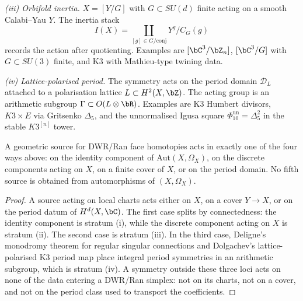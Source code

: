 \emph{(iii) Orbifold inertia.} $X=[Y/G]$ with
$G\subset SU(d)$ finite acting on a smooth Calabi--Yau $Y$. The
inertia stack
\[
 I(X)=\coprod_{[g]\in G/\mathrm{conj}}Y^g/C_G(g)
\]
records the action after quotienting. Examples are
$[\bC^3/\bZ_n]$, $[\bC^3/G]$ with $G\subset SU(3)$ finite, and K3
with Mathieu-type twining data.

\emph{(iv) Lattice-polarised period.} The symmetry acts on the period
domain $\mathcal D_L$ attached to a polarisation lattice
$L\subset H^2(X,\bZ)$. The acting group is an arithmetic subgroup
$\Gamma\subset O(L\otimes\bR)$. Examples are K3 Humbert divisors,
$K3\times E$ via Gritsenko $\Delta_5$, and the unnormalised Igusa
square $\Phi_{10}^{\mathrm{un}}=\Delta_5^2$ in the stable $K3^{[n]}$
tower.

\begin{proposition}
\label{prop:four-strata-exhaust}
A geometric source for DWR/Ran face homotopies acts in exactly one of
the four ways above: on the identity component of
$\mathrm{Aut}(X,\Omega_X)$, on the discrete components acting on $X$,
on a finite cover of $X$, or on the period domain. No fifth source is
obtained from automorphisms of $(X,\Omega_X)$.
\end{proposition}

\begin{proof}
A source acting on local charts acts either on $X$, on a cover
$Y\to X$, or on the period datum of $H^d(X,\bC)$. The first case splits
by connectedness: the identity component is stratum (i), while the
discrete component acting on $X$ is stratum (ii). The second case is
stratum (iii). In the third case, Deligne's monodromy theorem for
regular singular connections and Dolgachev's lattice-polarised K3
period map place integral period symmetries in an arithmetic subgroup,
which is stratum (iv). A symmetry outside these three loci acts on none
of the data entering a DWR/Ran simplex: not on its charts, not on a
cover, and not on the period class used to transport the coefficients.
\end{proof}

